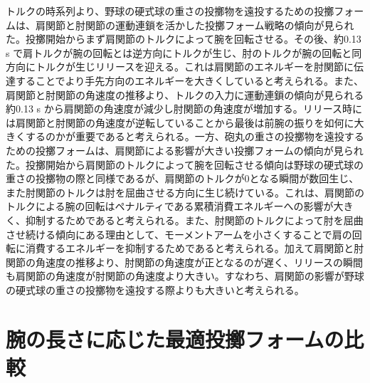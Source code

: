 トルクの時系列より、野球の硬式球の重さの投擲物を遠投するための投擲フォームは、肩関節と肘関節の運動連鎖を活かした投擲フォーム戦略の傾向が見られた。投擲開始からまず肩関節のトルクによって腕を回転させる。その後、約0.13 s で肩トルクが腕の回転とは逆方向にトルクが生じ、肘のトルクが腕の回転と同方向にトルクが生じリリースを迎える。これは肩関節のエネルギーを肘関節に伝達することでより手先方向のエネルギーを大きくしていると考えられる。また、肩関節と肘関節の角速度の推移より、トルクの入力に運動連鎖の傾向が見られる約0.13 s から肩関節の角速度が減少し肘関節の角速度が増加する。リリース時には肩関節と肘関節の角速度が逆転していることから最後は前腕の振りを如何に大きくするのかが重要であると考えられる。一方、砲丸の重さの投擲物を遠投するための投擲フォームは、肩関節による影響が大きい投擲フォームの傾向が見られた。投擲開始から肩関節のトルクによって腕を回転させる傾向は野球の硬式球の重さの投擲物の際と同様であるが、肩関節のトルクが0となる瞬間が数回生じ、また肘関節のトルクは肘を屈曲させる方向に生じ続けている。これは、肩関節のトルクによる腕の回転はペナルティである累積消費エネルギーへの影響が大きく、抑制するためであると考えられる。また、肘関節のトルクによって肘を屈曲させ続ける傾向にある理由として、モーメントアームを小さくすることで肩の回転に消費するエネルギーを抑制するためであると考えられる。加えて肩関節と肘関節の角速度の推移より、肘関節の角速度が正となるのが遅く、リリースの瞬間も肩関節の角速度が肘関節の角速度より大きい。すなわち、肩関節の影響が野球の硬式球の重さの投擲物を遠投する際よりも大きいと考えられる。


\section{腕の長さに応じた最適投擲フォームの比較}
